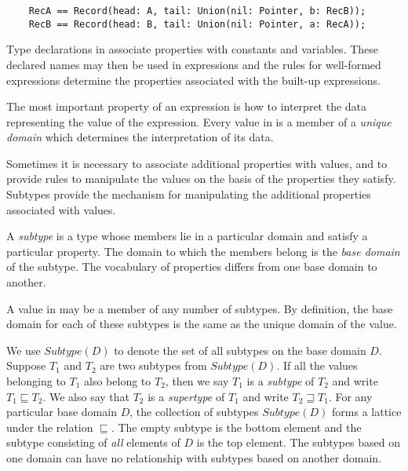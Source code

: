 \begin{small}
\begin{verbatim}
    RecA == Record(head: A, tail: Union(nil: Pointer, b: RecB));
    RecB == Record(head: B, tail: Union(nil: Pointer, a: RecA));
\end{verbatim}
\end{small}


Type declarations in \asharp{} associate properties with
constants and variables.
These declared names may then be used in expressions and the rules
for well-formed expressions determine the properties associated with
the built-up expressions.

The most important property of an expression is how to interpret
the data representing the value of the expression.
Every value in \asharp{} is a member of a {\em unique domain} which determines
the interpretation of its data.

Sometimes it is necessary to associate additional properties with
values, and to provide rules to manipulate the values on the basis of the
properties they satisfy.  Subtypes provide the mechanism for manipulating
the additional properties associated with values.

A {\em subtype} is a type whose members lie in a particular domain and satisfy
a particular property.  The domain to which the members belong is the
{\em base domain} of the subtype.
The vocabulary of properties differs from one base domain to another.

A value in \asharp{} may be a member of any number of subtypes.
By definition, the base domain for each of these subtypes is the same
as the unique domain of the value.

We use $Subtype(D)$ to denote the set of all subtypes on the base domain $D$.
Suppose $T_1$ and $T_2$ are two subtypes from $Subtype(D)$.
If all the values belonging to $T_1$ also belong to $T_2$, then we say
$T_1$ is a {\em subtype} of $T_2$ and write $T_1 \sqsubseteq T_2$.
We also say that
$T_2$ is a {\em supertype} of $T_1$ and write $T_2 \sqsupseteq T_1$.
For any particular base domain $D$, the collection of subtypes
$Subtype(D)$ forms a lattice under the relation $\sqsubseteq$.
The empty subtype is the bottom element and the subtype consisting
of {\em all} elements of $D$ is the top element.
The subtypes based on one domain can have no relationship with
subtypes based on another domain.

